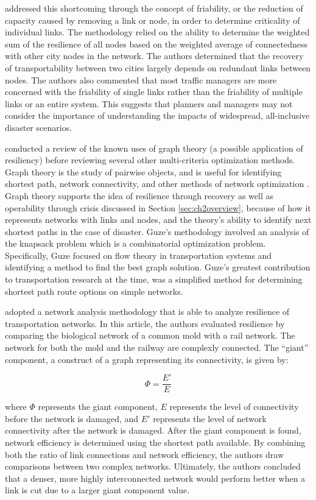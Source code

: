 \citet{ip2011} addressed this shortcoming through the concept of
{friability}, or
the reduction of capacity caused by removing a link or node, in order to
determine criticality of individual links. The methodology relied on the
ability
to determine the weighted sum of the resilience of all nodes based on the
weighted average of connectedness with other city nodes in the network. The
authors determined that the recovery of transportability between two cities
largely depends on redundant links between nodes. The authors also commented
that
most traffic managers are more concerned with the friability of single
links
rather than the friability of multiple links or an entire system. This suggests
that planners and managers may not consider the importance of
understanding the impacts of widespread, all-inclusive disaster scenarios.

\citet{guze2014} conducted a review of the known uses of graph theory
(a possible application of resiliency) before
reviewing several
other multi-criteria optimization methods.
Graph theory is the study of pairwise objects, and is
useful for identifying
shortest path, network connectivity, and other methods of network
optimization \citet{west2001}. Graph theory
supports the idea of resilience through recovery as well as operability through crisis discussed in
Section \ref{sec:ch2overview},
because of how it
represents networks with links and nodes, and the theory's ability to identify next
shortest paths in the
case of disaster. Guze’s methodology
involved an
analysis of the knapsack problem which is a combinatorial optimization problem.
Specifically, Guze focused on flow
theory in transportation
systems and identifying a method to find the best graph solution. Guze’s
greatest contribution to transportation research
at the time, was a simplified method
for determining shortest path route options on simple networks.

\citet{osei2014} adopted a network analysis methodology that is able to
analyze
resilience of transportation networks. In this
article, the authors evaluated resilience by comparing the biological
network of a common mold
with a rail network. The network for both the mold and the railway are
complexly connected. The ``giant'' component, a construct of a graph representing its connectivity, is given by:

\begin{equation}
	\Phi = \frac{E'}{ E}
\end{equation}

\noindent where $\Phi$ represents the giant component, $E$ represents the
level of connectivity before the network is damaged, and $E'$ represents the
level of network connectivity after the network is damaged. After the giant component
is found, network efficiency is determined using the
shortest path available. By combining both the ratio of link connections and
network efficiency, the authors draw comparisons between two
complex networks. Ultimately, the authors concluded that a denser, more highly
interconnected network would perform better when a link is cut due to a larger giant component value.

